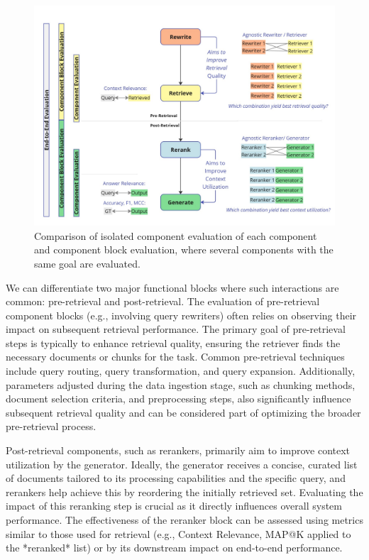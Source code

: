 \begin{figure}
  \centering
  \includegraphics[width=\textwidth]{images/ComponentBlockEvaluation.pdf}
  \caption{Comparison of isolated component evaluation of each component and component block evaluation, where several components with the same goal are evaluated.}
  \label{fig:componentblockeval}
\end{figure}


We can differentiate two major functional blocks where such interactions are common: pre-retrieval and post-retrieval. The evaluation of pre-retrieval component blocks (e.g., involving query rewriters) often relies on observing their impact on subsequent retrieval performance. The primary goal of pre-retrieval steps is typically to enhance retrieval quality, ensuring the retriever finds the necessary documents or chunks for the task. Common pre-retrieval techniques include query routing, query transformation, and query expansion. Additionally, parameters adjusted during the data ingestion stage, such as chunking methods, document selection criteria, and preprocessing steps, also significantly influence subsequent retrieval quality and can be considered part of optimizing the broader pre-retrieval process.

Post-retrieval components, such as rerankers, primarily aim to improve context utilization by the generator. Ideally, the generator receives a concise, curated list of documents tailored to its processing capabilities and the specific query, and rerankers help achieve this by reordering the initially retrieved set. Evaluating the impact of this reranking step is crucial as it directly influences overall system performance. The effectiveness of the reranker block can be assessed using metrics similar to those used for retrieval (e.g., Context Relevance, MAP@K applied to the *reranked* list) or by its downstream impact on end-to-end performance.

